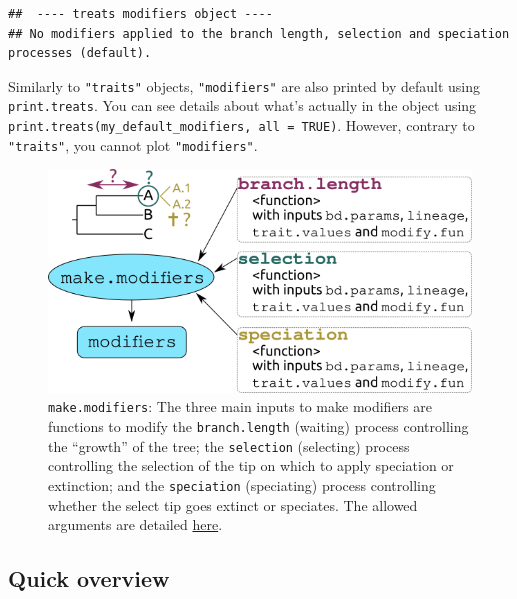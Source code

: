 \documentclass[
]{book}
\begin{document}
\begin{verbatim}
##  ---- treats modifiers object ---- 
## No modifiers applied to the branch length, selection and speciation processes (default).
\end{verbatim}

Similarly to \texttt{"traits"} objects, \texttt{"modifiers"} are also printed by default using \texttt{print.treats}.
You can see details about what's actually in the object using \texttt{print.treats(my\_default\_modifiers,\ all\ =\ TRUE)}.
However, contrary to \texttt{"traits"}, you cannot plot \texttt{"modifiers"}.

\begin{figure}
\centering
\includegraphics{make.modifiers.png}
\caption{\texttt{make.modifiers}: The three main inputs to make modifiers are functions to modify the \texttt{branch.length} (waiting) process controlling the ``growth'' of the tree; the \texttt{selection} (selecting) process controlling the selection of the tip on which to apply speciation or extinction; and the \texttt{speciation} (speciating) process controlling whether the select tip goes extinct or speciates. The allowed arguments are detailed \protect\hyperlink{allowarguments}{here}.}
\end{figure}

\hypertarget{quick-overview-1}{%
\subsection{Quick overview}\label{quick-overview-1}}
\end{document}

